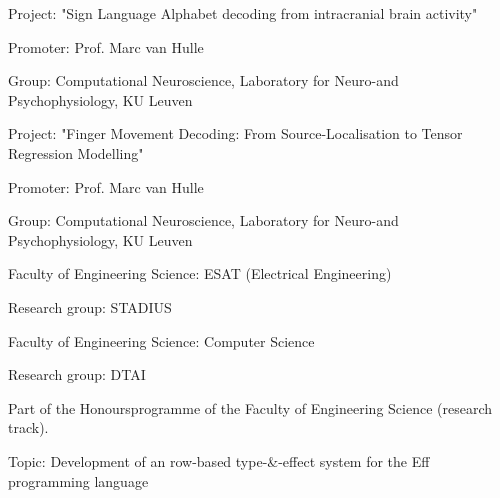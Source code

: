 
\begin{cventries}
{\begin{cvitems}\item Project: "Sign Language Alphabet decoding from intracranial brain activity"
\item Promoter: Prof. Marc van Hulle
\item Group:  Computational Neuroscience, Laboratory for Neuro-and Psychophysiology, KU Leuven
\end{cvitems}
}

{\begin{cvitems}\item Project: "Finger Movement Decoding: From Source-Localisation to Tensor Regression Modelling"
\item Promoter: Prof. Marc van Hulle
\item Group:  Computational Neuroscience, Laboratory for Neuro-and Psychophysiology, KU Leuven
\end{cvitems}
}

{\begin{cvitems}\item Faculty of Engineering Science: ESAT (Electrical Engineering)
\item Research group: STADIUS
\end{cvitems}
}

{\begin{cvitems}\item Faculty of Engineering Science: Computer Science
\item Research group: DTAI
\item Part of the Honoursprogramme of the Faculty of Engineering Science (research track).
\item Topic: Development of an row-based type-\&-effect system for the Eff programming language
\end{cvitems}
}


\end{cventries}
